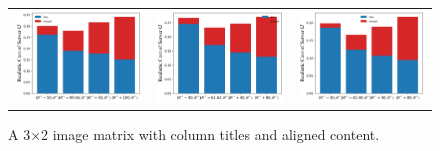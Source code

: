 \documentclass{article}
\theoremstyle{plain}
\theoremstyle{definition}
\theoremstyle{remark}
\begin{document}
\begin{figure}[htbp]
\begin{tabular}{ccc}
      \includegraphics[width=0.3\linewidth]{figures/figure_75_A.png} &
      \includegraphics[width=0.3\linewidth]{figures/figure_75_B.png} &
      \includegraphics[width=0.3\linewidth]{figures/figure_75_C.png} \\ %
      
  \end{tabular}
  
  \caption{A 3×2 image matrix with column titles and aligned content.}
  \label{fig:server_accuracy_reward}
\end{figure}

\end{document}
